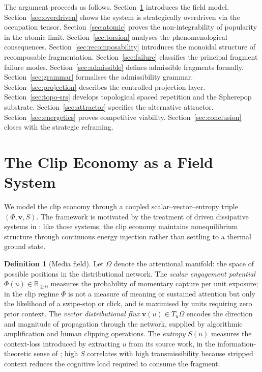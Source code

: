 \documentclass{amsart}
\theoremstyle{plain}
\theoremstyle{definition}
\newtheorem{definition}[theorem]{Definition}
\theoremstyle{remark}
\newcommand{\scalar}{\Phi}
\newcommand{\vfield}{\mathbf{v}}
\newcommand{\entr}{S}
\begin{document}
The argument proceeds as follows.
Section~\ref{sec:field} introduces the field model.
Section~\ref{sec:overdriven} shows the system is strategically overdriven via the
occupation tensor.
Section~\ref{sec:atomic} proves the non-integrability of popularity in the atomic
limit.
Section~\ref{sec:torsion} analyses the phenomenological consequences.
Section~\ref{sec:recomposability} introduces the monoidal structure of
recomposable fragmentation.
Section~\ref{sec:failure} classifies the principal fragment failure modes.
Section~\ref{sec:admissible} defines admissible fragments formally.
Section~\ref{sec:grammar} formalises the admissibility grammar.
Section~\ref{sec:projection} describes the controlled projection layer.
Section~\ref{sec:topo-srs} develops topological spaced repetition and the
Spherepop substrate.
Section~\ref{sec:attractor} specifies the alternative attractor.
Section~\ref{sec:energetics} proves competitive viability.
Section~\ref{sec:conclusion} closes with the strategic reframing.

\section{The Clip Economy as a Field System}
\label{sec:field}

We model the clip economy through a coupled scalar--vector--entropy triple
$(\scalar, \vfield, \entr)$.  The framework is motivated by the treatment of
driven dissipative systems in \cite{cross1993,prigogine1984}: like those systems,
the clip economy maintains nonequilibrium structure through continuous energy
injection rather than settling to a thermal ground state.

\begin{definition}[Media field]
  \label{def:rsvp-media}
  Let $\Omega$ denote the attentional manifold: the space of possible positions in
  the distributional network.  The \emph{scalar engagement potential}
  $\scalar(u) \in \mathbb{R}_{\geq 0}$ measures the probability of momentary
  capture per unit exposure; in the clip regime $\scalar$ is not a measure of
  meaning or sustained attention but only the likelihood of a swipe-stop or click,
  and is maximised by units requiring zero prior context.  The \emph{vector
  distributional flux} $\vfield(u) \in T_u\Omega$ encodes the direction and
  magnitude of propagation through the network, supplied by algorithmic
  amplification and human clipping operations.  The \emph{entropy} $\entr(u)$
  measures the context-loss introduced by extracting $u$ from its source work, in
  the information-theoretic sense of \cite{shannon1948,cover2006}; high $\entr$
  correlates with high transmissibility because stripped context reduces the
  cognitive load required to consume the fragment.
\end{definition}
\end{document}

